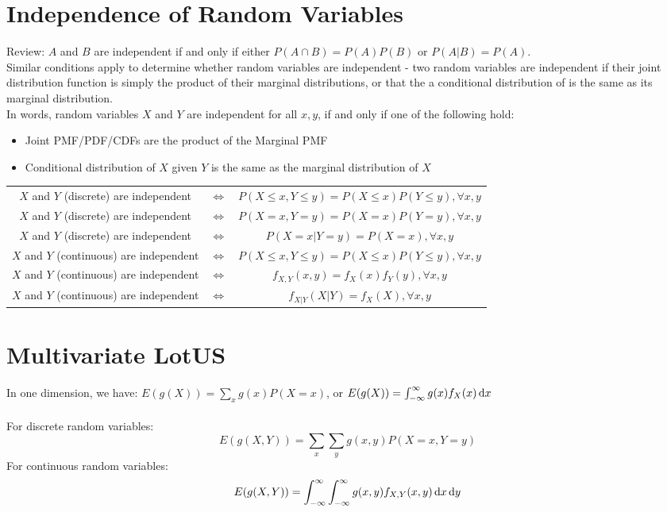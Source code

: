 \documentclass[11.5pt]{article}
\begin{document}
\begin{notes}
\section*{Independence of Random Variables}
Review: $A$ and $B$ are independent if and only if either $P(A\cap B) = P(A)P(B)$ or $P(A|B) = P(A)$. \\

Similar conditions apply to determine whether random variables are independent - two random variables are independent if their joint distribution function is simply the product of their marginal distributions, or that the a conditional distribution of is the same as its marginal distribution. \\

In words, random variables $X$ and $Y$ are independent for all $x, y$, if and only if one of the following hold:
\begin{itemize}
	\itemsep -1mm
	\item Joint PMF/PDF/CDFs are the product of the Marginal PMF
	\item Conditional distribution of $X$ given $Y$ is the same as the marginal distribution of $X$
\end{itemize}

\begin{table}[htb]
	\begin{tabular}{ccc}
		$X$ and $Y$ (discrete) are independent  & $\Longleftrightarrow$ & $P(X \leq x, Y \leq y) = P(X \leq x)P(Y \leq y),  \forall x, y$ \\ 
		$X$ and $Y$ (discrete) are independent  & $\Longleftrightarrow$ & $P(X=x, Y=y) = P(X=x)P(Y=y),  \forall x, y$ \\ 
		$X$ and $Y$ (discrete) are independent  & $\Longleftrightarrow$ & $P(X=x | Y=y) = P(X=x),  \forall x, y$ \\ 
		$X$ and $Y$  (continuous) are independent  & $\Longleftrightarrow$ & $P(X \leq x, Y \leq y) = P(X \leq x)P(Y \leq y),  \forall x, y$ \\ 
		$X$ and $Y$  (continuous) are independent  & $\Longleftrightarrow$ & $f_{X, Y}(x, y) = f_X(x)f_Y(y), \forall x, y$ \\ 
		$X$ and $Y$  (continuous) are independent  & $\Longleftrightarrow$ & $f_{X|Y}(X|Y) = f_X(X), \forall x, y$ 
	\end{tabular}
\end{table}

\section*{Multivariate LotUS}
In one dimension, we have: $E(g(X)) = \sum_xg(x)P(X=x)$, or $E(g(X)) = \int_{-\infty}^{\infty}g(x)f_X(x) \mathop{}\!\mathrm{d} x$\\ \\ 
For discrete random variables:
$$E(g(X, Y)) = \sum_x\sum_yg(x, y)P(X=x, Y=y)$$
For continuous random variables:
$$E(g(X, Y)) = \int_{-\infty}^{\infty}\int_{-\infty}^{\infty}g(x, y)f_{X,Y}(x, y) \mathop{}\!\mathrm{d} x \mathop{}\!\mathrm{d} y $$

\end{notes}
\end{document}
